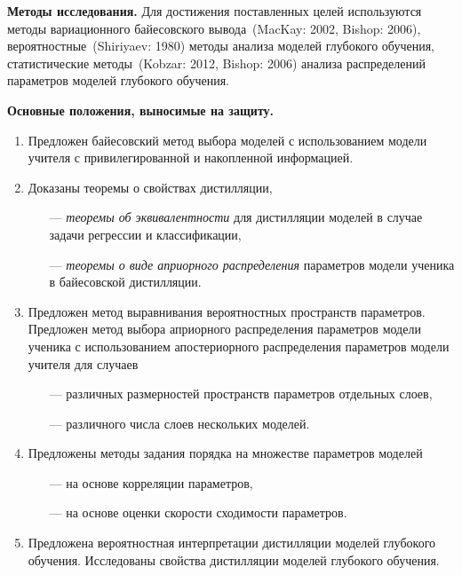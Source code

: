 \documentclass{dissert}
\begin{document}
\vspace{0.5cm}
\textbf{Методы исследования.} Для достижения поставленных целей используются методы вариационного байесовского вывода~(MacKay: 2002, Bishop: 2006), вероятностные~(Shiriyaev: 1980) методы анализа моделей глубокого обучения, статистические методы~(Kobzar: 2012, Bishop: 2006) анализа распределений параметров моделей глубокого обучения.

\vspace{0.5cm}
\textbf{Основные положения, выносимые на защиту.}
\vspace{0.3cm}
\begin{enumerate}
    \item Предложен байесовский метод выбора моделей с использованием модели учителя с привилегированной и накопленной информацией.
    \item Доказаны теоремы о свойствах дистилляции, 
    \begin{itemize}
        \item[---] \emph{теоремы об эквивалентности} для дистилляции моделей в случае задачи регрессии и классификации,
        \item[---] \emph{теоремы о виде априорного распределения} параметров модели ученика в байесовской дистилляции.
    \end{itemize}
    \item Предложен метод выравнивания вероятностных пространств параметров. Предложен метод выбора априорного распределения параметров модели ученика с использованием апостериорного распределения параметров модели учителя для случаев
    \begin{itemize}
        \item[---] различных размерностей пространств параметров отдельных слоев,
        \item[---] различного числа слоев нескольких моделей.
    \end{itemize}
    \item Предложены методы задания порядка на множестве параметров моделей
    \begin{itemize}
        \item[---] на основе корреляции параметров,
        \item[---] на основе оценки скорости сходимости параметров.
    \end{itemize}
    \item Предложена вероятностная интерпретации дистилляции моделей глубокого обучения. Исследованы свойства дистилляции моделей глубокого обучения.
\end{enumerate}
\end{document}
